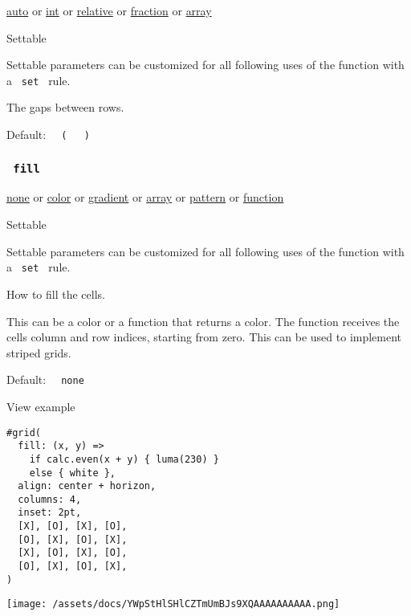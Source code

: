 \href{/docs/reference/foundations/auto/}{auto} {or}
\href{/docs/reference/foundations/int/}{int} {or}
\href{/docs/reference/layout/relative/}{relative} {or}
\href{/docs/reference/layout/fraction/}{fraction} {or}
\href{/docs/reference/foundations/array/}{array}

{{ Settable }}

\label{parameters-row-gutter-settable-tooltip}
Settable parameters can be customized for all following uses of the
function with a \texttt{\ set\ } rule.

The gaps between rows.

Default:
\texttt{\ }{\texttt{\ (\ }}\texttt{\ }{\texttt{\ )\ }}\texttt{\ }

\subsubsection{\texorpdfstring{\texttt{\ fill\ }}{ fill }}\label{parameters-fill}

\href{/docs/reference/foundations/none/}{none} {or}
\href{/docs/reference/visualize/color/}{color} {or}
\href{/docs/reference/visualize/gradient/}{gradient} {or}
\href{/docs/reference/foundations/array/}{array} {or}
\href{/docs/reference/visualize/pattern/}{pattern} {or}
\href{/docs/reference/foundations/function/}{function}

{{ Settable }}

\label{parameters-fill-settable-tooltip}
Settable parameters can be customized for all following uses of the
function with a \texttt{\ set\ } rule.

How to fill the cells.

This can be a color or a function that returns a color. The function
receives the cells\textquotesingle{} column and row indices, starting
from zero. This can be used to implement striped grids.

Default: \texttt{\ }{\texttt{\ none\ }}\texttt{\ }


View example

\begin{verbatim}
#grid(
  fill: (x, y) =>
    if calc.even(x + y) { luma(230) }
    else { white },
  align: center + horizon,
  columns: 4,
  inset: 2pt,
  [X], [O], [X], [O],
  [O], [X], [O], [X],
  [X], [O], [X], [O],
  [O], [X], [O], [X],
)
\end{verbatim}

\texttt{[image: /assets/docs/YWpStHlSHlCZTmUmBJs9XQAAAAAAAAAA.png]}

